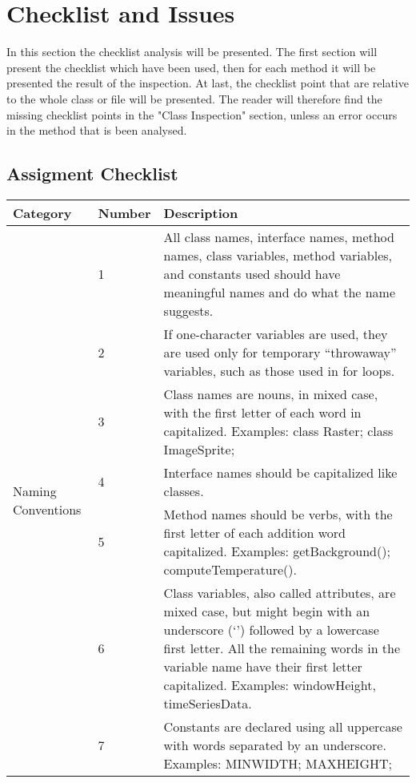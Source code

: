 \documentclass[11pt, a4paper,titlepage]{article}
\begin{document}
\section{Checklist and Issues}
In this section the checklist analysis will be presented.\newline
The first section will present the checklist which have been used, then for each method it will be presented the result of the inspection. At last, the checklist point that are relative to the whole class or file will be presented.
\newline The reader will therefore find the missing checklist points in the "Class Inspection" section, unless an error occurs in the method that is been analysed.
\subsection{Assigment Checklist}
\begin{tabularx}{\textwidth}{| X | l | X |}
	\hline \textbf{Category} & \textbf{Number} & \textbf{Description} \\
	\hline
	\multirow{7}{*}{Naming Conventions} & \label{itm:1} 1 & 
	All class names, interface names, method names, class variables, method
	variables, and constants used should have meaningful names and do what
	the name suggests. \\ \cline{2-3}
										& \label{itm:2} 2 &  
	If one-character variables are used, they are used only for temporary
	“throwaway” variables, such as those used in for loops. \\ \cline{2-3}
										& \label{itm:3} 3 &  
										Class names are nouns, in mixed case, with the first letter of each word in
										capitalized. Examples: class Raster; class ImageSprite; \\ \cline{2-3}
										& \label{itm:4} 4 & 
										Interface names should be capitalized like classes. \\ \cline{2-3}
										& \label{itm:5} 5 & 
										Method names should be verbs, with the first letter of each addition word
										capitalized. Examples: getBackground(); computeTemperature(). \\ \cline{2-3}
										& \label{itm:6} 6 &  
										Class variables, also called attributes, are mixed case, but might begin
										with an underscore (‘\textunderscore’) followed by a lowercase first letter. All the
										remaining words in the variable name have their first letter capitalized.
										Examples: \textunderscore windowHeight, timeSeriesData. \\ \cline{2-3}
										& \label{itm:7} 7 &  
										Constants are declared using all uppercase with words separated by an
										underscore. Examples: MIN\textunderscore WIDTH; MAX\textunderscore HEIGHT;	\\ \hline
						\end{tabularx}
						
\end{document}
